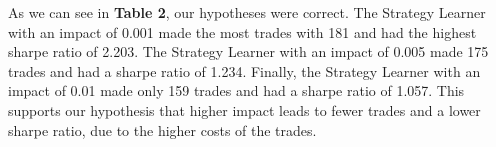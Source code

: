 \documentclass[
	letterpaper, %
]{jdf}
\begin{document}
As we can see in \textbf{Table 2}, our hypotheses were correct.
The Strategy Learner with an impact of 0.001 made the most trades with 181 and had the highest sharpe ratio of 2.203.
The Strategy Learner with an impact of 0.005 made 175 trades and had a sharpe ratio of 1.234.
Finally, the Strategy Learner with an impact of 0.01 made only 159 trades and had a sharpe ratio of 1.057.
This supports our hypothesis that higher impact leads to fewer trades and a lower sharpe ratio, due to the higher costs of the trades.
\end{document}
